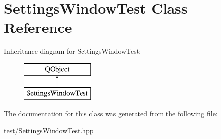 \hypertarget{classSettingsWindowTest}{\section{Settings\+Window\+Test Class Reference}
\label{classSettingsWindowTest}
}
Inheritance diagram for Settings\+Window\+Test\+:\begin{figure}[H]
\begin{center}
\leavevmode
\includegraphics[height=2.000000cm]{classSettingsWindowTest}
\end{center}
\end{figure}


The documentation for this class was generated from the following file\+:\begin{DoxyCompactItemize}
\item 
test/Settings\+Window\+Test.\+hpp\end{DoxyCompactItemize}

